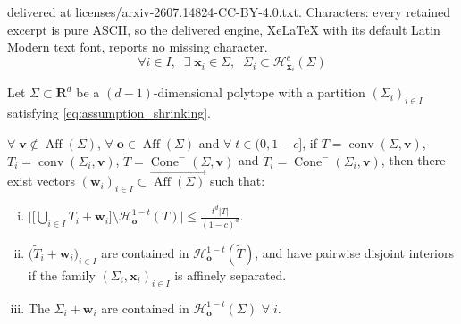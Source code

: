 \documentclass[10pt,a4paper]{amsart}
\newcommand{\R}{\mathbf{R}}
\newcommand{\ocone}[2]{\operatorname{Cone}^-(#1,#2)}
\begin{document}
delivered at licenses/arxiv-2607.14824-CC-BY-4.0.txt. Characters: every retained excerpt is pure ASCII, so the delivered engine, XeLaTeX with its default Latin Modern text font, reports no missing character.
\begin{equation}\label{eq:assumption_shrinking} 
\boxed{\forall i\in I, \;\; \exists \;\mathbf{x}_i \in \Sigma,\;\;\Sigma_i \subset \mathcal{H}_{\mathbf{x}_i}^c(\Sigma)}
\end{equation}

\begin{proposition}\label{prop: base case}
Let $\Sigma \subset \R^d$ be a  $(d-1)$-dimensional polytope with a partition $(\Sigma_i)_{i \in I}$ satisfying \eqref{eq:assumption_shrinking}. 

$ \forall\;\mathbf{v}\notin \operatorname{Aff}(\Sigma)$, $\forall\;\mathbf{o}\in \operatorname{Aff}(\Sigma)$ and $\forall\;t\in (0,1-c]$, if $T=\operatorname{conv}(\Sigma, \mathbf{v})$, $T_i=\operatorname{conv}(\Sigma_i, \mathbf{v})$, $\widetilde{T}=\ocone{\Sigma}{\mathbf{v}}$ and $\widetilde{T}_i=\ocone{\Sigma_i}{\mathbf{v}}$, then there exist vectors $(\mathbf{w}_i)_{i\in I}\subset \overrightarrow{\operatorname{Aff}(\Sigma)}$ such that:
\begin{enumerate}[(i)]
    \item $\displaystyle \bigg|\bigg[\bigcup_{i\in I} T_i+\mathbf{w}_i\bigg]\setminus \mathcal{H}^{1-t}_\mathbf{o}(T)\bigg|\leq \frac{t^d|T|}{(1-c)^d} $.
    \item $\displaystyle \big(\widetilde{T}_i+\mathbf{w}_i\big)_{i\in I}$ are contained in $\mathcal{H}_\mathbf{o}^{1-t}(\widetilde{T})$, and have pairwise disjoint interiors if the family $(\Sigma_i,\mathbf{x}_i)_{i \in I}$ is affinely separated.
    \item The $\Sigma_i+
    \mathbf{w}_i$ are contained in $\mathcal{H}_\mathbf{o}^{1-t}(\Sigma)$ $\forall\;i$.
\end{enumerate}
\end{proposition}
\end{document}
